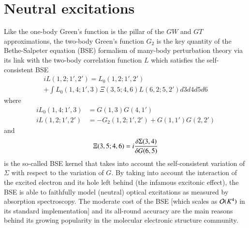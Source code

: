 \documentclass[aip,jcp,reprint,noshowkeys,superscriptaddress]{revtex4-1}
\begin{document}
\section{Neutral excitations}
\label{sec:neutral}
Like the one-body Green's function is the pillar of the $GW$ and $GT$ approximations, the two-body Green's function $G_2$ is the key quantity of the Bethe-Salpeter equation (BSE) formalism of many-body perturbation theory \cite{Salpeter_1951,Strinati_1988,Blase_2018,Blase_2020} via its link with the two-body correlation function $L$ which satisfies the self-consistent BSE 
\begin{multline}
	 iL(1,2;1',2') = L_0(1,2;1',2') 
	 \\
	 + \int L_0(1,4;1',3) \Xi(3,5;4,6) L(6,2;5,2') d3d4d5d6
\end{multline}
where
\begin{subequations}
\begin{align}
	 iL_0(1,4;1',3) & = G(1,3) G(4,1')
	 \\
	 iL(1,2;1',2') & = -G_2(1,2;1',2') + G(1,1')G(2,2')
\end{align}
\end{subequations}
and 
\begin{equation}
\label{eq:Xi}
	\Xi(3,5;4,6) = i \fdv{\Sigma(3,4)}{G(6,5)}
\end{equation}
is the so-called BSE kernel that takes into account the self-consistent variation of $\Sigma$ with respect to the variation of $G$.
By taking into account the interaction of the excited electron and its hole left behind (the infamous excitonic effect), the BSE is able to faithfully model (neutral) optical excitations as measured by absorption spectroscopy. 
The moderate cost of the BSE [which scales as $\order*{K^4}$ in its standard implementation] and its all-round accuracy are the main reasons behind its growing popularity in the molecular electronic structure community. \cite{Rohlfing_1999a,Horst_1999,Puschnig_2002,Tiago_2003,Boulanger_2014,Jacquemin_2015a,Bruneval_2015,Jacquemin_2015b,Hirose_2015,Jacquemin_2017a,Jacquemin_2017b,Rangel_2017,Krause_2017,Gui_2018,Blase_2018,Liu_2020,Blase_2020,Holzer_2018a,Holzer_2018b,Loos_2020e,Loos_2021}
\end{document}
